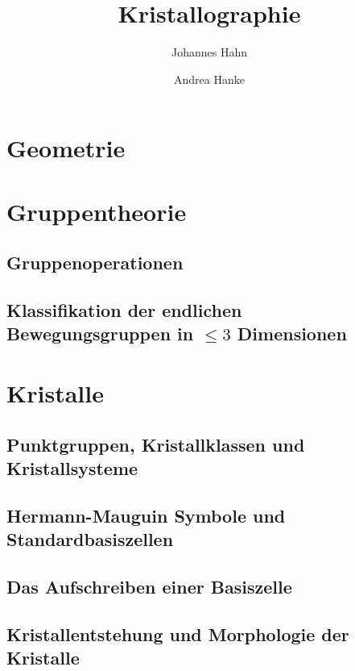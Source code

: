 \documentclass[fontsize=11pt,fleqn,a4paper]{scrartcl}
\title{Kristallographie}
\author{Johannes Hahn \and Andrea Hanke}
\begin{document}
\maketitle

\section{Geometrie}




\section{Gruppentheorie}

\subsection{Gruppenoperationen}

\subsection{Klassifikation der endlichen Bewegungsgruppen in $\leq 3$ Dimensionen}




\pagebreak
\section{Kristalle}

\subsection{Punktgruppen, Kristallklassen und Kristallsysteme}

\subsection{Hermann-Mauguin Symbole und Standardbasiszellen}

\subsection{Das Aufschreiben einer Basiszelle}

\subsection{Kristallentstehung und Morphologie der Kristalle}



\end{document}
